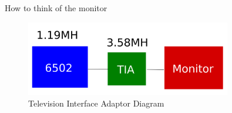 \documentclass{beamer}
\begin{document}
\begin{frame}{How to think of the monitor}
    \begin{figure}
        \centering
        \includegraphics[width=0.8\textwidth]{TIA_diagram.png} %

        \caption{Television Interface Adaptor Diagram}
    \end{figure}
\end{frame}






%
%
%
%
\end{document}
